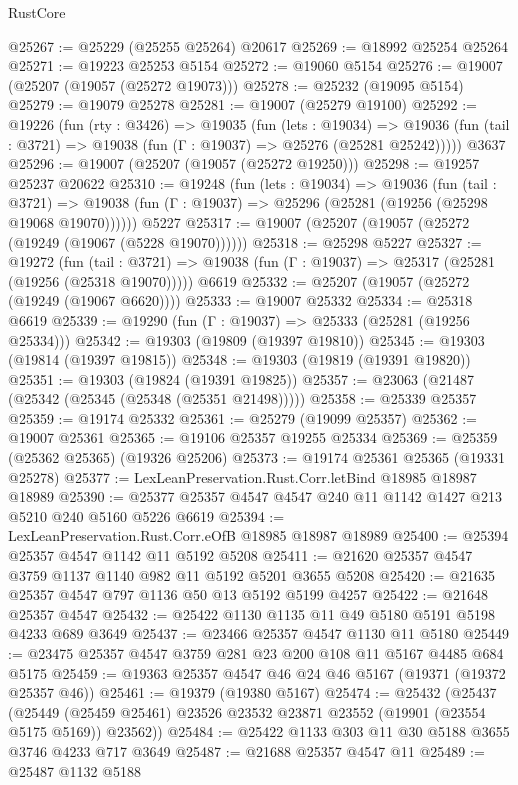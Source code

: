 \begin{lexlean}{RustCore}
\begin{coremodule}
@25267 := @25229 (@25255 @25264) @20617
@25269 := @18992 @25254 @25264
@25271 := @19223 @25253 @5154
@25272 := @19060 @5154
@25276 := @19007 (@25207 (@19057 (@25272 @19073)))
@25278 := @25232 (@19095 @5154)
@25279 := @19079 @25278
@25281 := @19007 (@25279 @19100)
@25292 := @19226
    (fun (rty : @3426) =>
    @19035
      (fun (lets : @19034) =>
      @19036 (fun (tail : @3721) => @19038 (fun (Γ : @19037) => @25276 (@25281 @25242)))))
    @3637
@25296 := @19007 (@25207 (@19057 (@25272 @19250)))
@25298 := @19257 @25237 @20622
@25310 := @19248
    (fun (lets : @19034) =>
    @19036
      (fun (tail : @3721) =>
      @19038 (fun (Γ : @19037) => @25296 (@25281 (@19256 (@25298 @19068 @19070))))))
    @5227
@25317 := @19007 (@25207 (@19057 (@25272 (@19249 (@19067 (@5228 @19070))))))
@25318 := @25298 @5227
@25327 := @19272
    (fun (tail : @3721) => @19038 (fun (Γ : @19037) => @25317 (@25281 (@19256 (@25318 @19070)))))
    @6619
@25332 := @25207 (@19057 (@25272 (@19249 (@19067 @6620))))
@25333 := @19007 @25332
@25334 := @25318 @6619
@25339 := @19290 (fun (Γ : @19037) => @25333 (@25281 (@19256 @25334)))
@25342 := @19303 (@19809 (@19397 @19810))
@25345 := @19303 (@19814 (@19397 @19815))
@25348 := @19303 (@19819 (@19391 @19820))
@25351 := @19303 (@19824 (@19391 @19825))
@25357 := @23063 (@21487 (@25342 (@25345 (@25348 (@25351 @21498)))))
@25358 := @25339 @25357
@25359 := @19174 @25332
@25361 := @25279 (@19099 @25357)
@25362 := @19007 @25361
@25365 := @19106 @25357 @19255 @25334
@25369 := @25359 (@25362 @25365) (@19326 @25206)
@25373 := @19174 @25361 @25365 (@19331 @25278)
@25377 := LexLeanPreservation.Rust.Corr.letBind @18985 @18987 @18989
@25390 := @25377 @25357 @4547 @4547 @240 @11 @1142 @1427 @213 @5210 @240 @5160 @5226 @6619
@25394 := LexLeanPreservation.Rust.Corr.eOfB @18985 @18987 @18989
@25400 := @25394 @25357 @4547 @1142 @11 @5192 @5208
@25411 := @21620 @25357 @4547 @3759 @1137 @1140 @982 @11 @5192 @5201 @3655 @5208
@25420 := @21635 @25357 @4547 @797 @1136 @50 @13 @5192 @5199 @4257
@25422 := @21648 @25357 @4547
@25432 := @25422 @1130 @1135 @11 @49 @5180 @5191 @5198 @4233 @689 @3649
@25437 := @23466 @25357 @4547 @1130 @11 @5180
@25449 := @23475 @25357 @4547 @3759 @281 @23 @200 @108 @11 @5167 @4485 @684 @5175
@25459 := @19363 @25357 @4547 @46 @24 @46 @5167 (@19371 (@19372 @25357 @46))
@25461 := @19379 (@19380 @5167)
@25474 := @25432
    (@25437
      (@25449 (@25459 @25461) @23526 @23532 @23871 @23552 (@19901 (@23554 @5175 @5169)) @23562))
@25484 := @25422 @1133 @303 @11 @30 @5188 @3655 @3746 @4233 @717 @3649
@25487 := @21688 @25357 @4547 @11
@25489 := @25487 @1132 @5188

\end{coremodule}
\end{lexlean}
